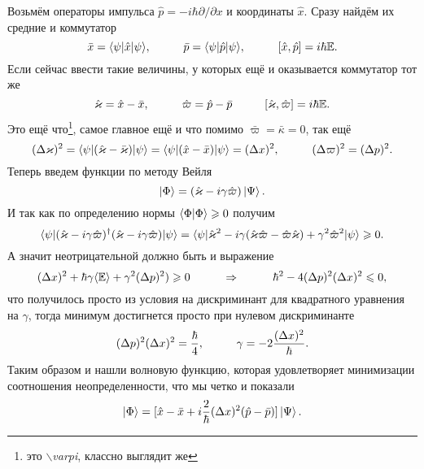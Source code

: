 Возьмём операторы импульса $\hat{p} = - i \hbar \partial/\partial x$ и координаты $\hat{x}$.
Сразу найдём их средние и коммутатор
\begin{equation*}
	\bar{x} = \bk{\psi}[\hat{x}]{\psi},
	\hspace{1 cm}
	\bar{p} = \bk{\psi}[\hat{p}]{\psi},
	\hspace{1 cm}
	[\hat{x}, \hat{p}] = i \hbar \mathbb{E}.
\end{equation*}
Если сейчас ввести такие величины, у которых ещё и оказывается коммутатор тот же
\begin{equation*}
	\hat{\kappa} = \hat{x} - \bar{x},
	\hspace{1 cm}
	\hat{\varpi} = \hat{p} - \bar{p}
	\hspace{1 cm}
	[\hat{\kappa},\hat{\varpi}] = i \hbar \mathbb{E}.
\end{equation*}
Это ещё что\footnote{это $\backslash$\textit{varpi}, классно выглядит же}, самое главное ещё и что помимо $\bar{\varpi} = \bar{\kappa} = 0$, так ещё
\begin{equation*}
	(\Delta \kappa)^2 = \bk{\psi}[(\hat{\kappa} - \bar{\kappa})]{\psi} = \bk{\psi}[(\hat{x} - \bar{x})]{\psi} = (\Delta x)^2,
	\hspace{1 cm}
	(\Delta \varpi)^2 = (\Delta p)^2.
\end{equation*}
Теперь введем функции по методу Вейля
\begin{equation*}
	\ket{\Phi} = (\hat{\kappa} - i \gamma \hat{\varpi}) \ket{\Psi}.
\end{equation*}
И так как по определению нормы $\bk{\Phi}{\Phi} \geq 0$ получим
\begin{equation*}
	\bk{\psi}[(\hat{\kappa} - i \gamma \hat{\varpi})^\dagger (\hat{\kappa} - i \gamma \hat{\varpi})]{\psi}
	=
	\bk{\psi}[\hat{\kappa}^2 - i \gamma (\hat{\kappa} \hat{\varpi} - \hat{\varpi} \hat{\kappa}) + \gamma^2 \hat{\varpi}^2]{\psi} \geq 0.
\end{equation*}
А значит неотрицательной должно быть и выражение
\begin{equation*}
	(\Delta x)^2 + \hbar \gamma \langle\mathbb{E}\rangle + \gamma^2 (\Delta p)^2) \geq 0
	\hspace{1 cm}
	\Rightarrow
	\hspace{1 cm}
	\hbar^2 - 4 (\Delta p )^2 (\Delta x )^2 \leq 0,
\end{equation*}
что получилось просто из условия на дискриминант для квадратного уравнения на $\gamma$, тогда минимум достигнется просто при нулевом дискриминанте
\begin{equation*}
	(\Delta p)^2 (\Delta x)^2 = \frac{\hbar}{4},
	\hspace{1 cm}
	\gamma = - 2 \frac{(\Delta x)^2}{\hbar}.
\end{equation*}
Таким образом и нашли волновую функцию, которая удовлетворяет минимизации соотношения неопределенности, что мы четко и показали
\begin{equation*}
	\ket{\Phi} = [\hat{x} - \bar{x} + i \frac{2}{\hbar} (\Delta x)^2 (\hat{p} - \bar{p})] \ket{\Psi}.
\end{equation*}